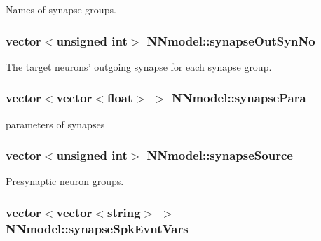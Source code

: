Names of synapse groups. 

\hypertarget{classNNmodel_a7d6d9860957c931725cead04ee0d6d98}{
\subsubsection[{synapse\+Out\+Syn\+No}]{\setlength{\rightskip}{0pt plus 5cm}vector$<$unsigned int$>$ N\+Nmodel\+::synapse\+Out\+Syn\+No}}\label{classNNmodel_a7d6d9860957c931725cead04ee0d6d98}


The target neurons' outgoing synapse for each synapse group. 

\hypertarget{classNNmodel_a65795cabef5f0d1f75e8c08530750d0e}{
\subsubsection[{synapse\+Para}]{\setlength{\rightskip}{0pt plus 5cm}vector$<$vector$<$float$>$ $>$ N\+Nmodel\+::synapse\+Para}}\label{classNNmodel_a65795cabef5f0d1f75e8c08530750d0e}


parameters of synapses 

\hypertarget{classNNmodel_a39861eefc8f7b13c21aaf82142520227}{
\subsubsection[{synapse\+Source}]{\setlength{\rightskip}{0pt plus 5cm}vector$<$unsigned int$>$ N\+Nmodel\+::synapse\+Source}}\label{classNNmodel_a39861eefc8f7b13c21aaf82142520227}


Presynaptic neuron groups. 

\hypertarget{classNNmodel_a30e4ebc1109de5e7d921b22f1597cbf4}{
\subsubsection[{synapse\+Spk\+Evnt\+Vars}]{\setlength{\rightskip}{0pt plus 5cm}vector$<$vector$<$string$>$ $>$ N\+Nmodel\+::synapse\+Spk\+Evnt\+Vars}}\label{classNNmodel_a30e4ebc1109de5e7d921b22f1597cbf4}


